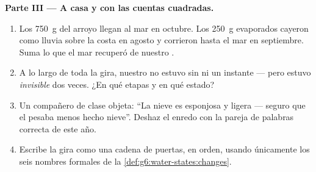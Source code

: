 \begin{problem}
\medskip\noindent\textbf{Parte III --- A casa y con las cuentas
cuadradas.}
\begin{enumerate}[resume]
  \item Los \qty{750}{g} del arroyo llegan al mar en octubre. Los
        \qty{250}{g} evaporados cayeron como lluvia sobre la costa en
        agosto y corrieron hasta el mar en septiembre. Suma lo que el
        mar recuperó de nuestro .
  \item A lo largo de toda la gira, nuestro  no estuvo sin
         ni un instante --- pero estuvo \emph{invisible} dos
        veces. ¿En qué etapas y en qué estado?
  \item Un compañero de clase objeta: ``La nieve es esponjosa y
        ligera --- seguro que el  pesaba menos hecho
        nieve''. Deshaz el enredo con la pareja de palabras correcta
        de este año.
  \item Escribe la gira como una cadena de puertas, en orden, usando
        únicamente los seis nombres formales de la
        \cref{def:g6:water-states:changes}.
\end{enumerate}
\end{problem}
